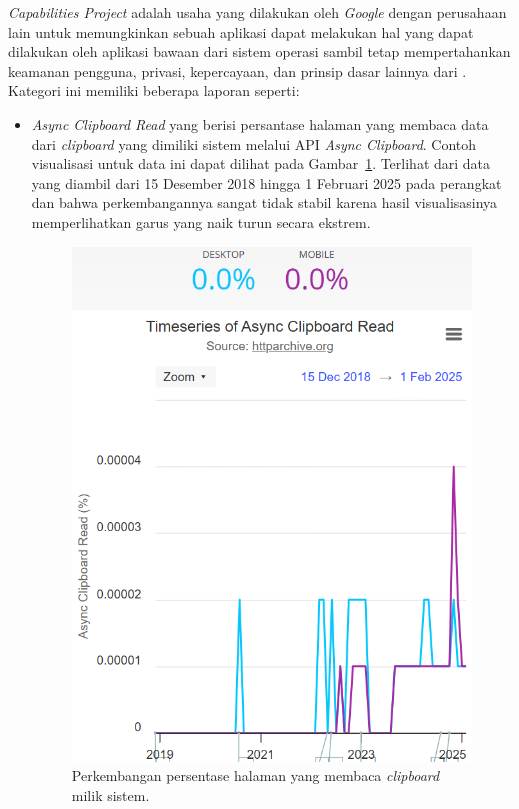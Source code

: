 \textit{Capabilities Project} adalah usaha yang dilakukan oleh \textit{Google} dengan perusahaan lain untuk memungkinkan sebuah aplikasi \web dapat melakukan hal yang dapat dilakukan oleh aplikasi bawaan dari sistem operasi sambil tetap mempertahankan keamanan pengguna, privasi, kepercayaan, dan prinsip dasar lainnya dari \web. Kategori ini memiliki beberapa laporan seperti:
\begin{itemize}
    \item \textit{Async Clipboard Read} yang berisi persantase halaman yang membaca data dari \textit{clipboard} yang dimiliki sistem melalui API \textit{Async Clipboard}. Contoh visualisasi untuk data ini dapat dilihat pada Gambar~\ref{fig:async}. Terlihat dari data yang diambil dari 15 Desember 2018 hingga 1 Februari 2025 pada perangkat \desktop dan \mobile bahwa perkembangannya sangat tidak stabil karena hasil visualisasinya memperlihatkan garus yang naik turun secara ekstrem.
    \begin{figure}[H]
        \centering
        \includegraphics[width=0.4\linewidth]{Gambar/Contoh Async.png}
        \caption{Perkembangan persentase halaman \web yang membaca \textit{clipboard} milik sistem.}
        \label{fig:async}
    \end{figure}
    


\end{itemize}
